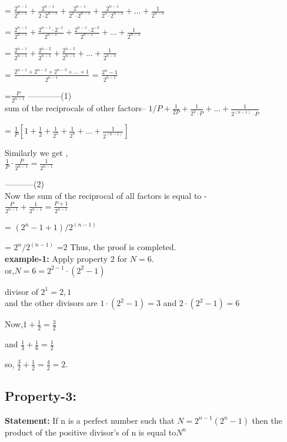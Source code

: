 \documentclass[12pt,,a4paper]{book}
\begin{document}
= $\frac{2^{n-1}}{2^{n-1}} + \frac{2^{n-1}}{2 \cdot 2^{n-1}} + \frac{2^{n-1}}{2^2 \cdot 2^{n-1}} + \frac{2^{n-1}}{2^3 \cdot 2^{n-1}} + \ldots + \frac{1}{2^{n-1}}$

=  $\frac{2^{n-1}}{2^{n-1}} + \frac{2^{n-1} \cdot 2^{-1}}{2^{n-1}} + \frac{2^{n-1} \cdot 2^{-2}}{2^{n-1}} + \ldots + \frac{1}{2^{n-1}}$

=  $\frac{2^{n-1}}{2^{n-1}} + \frac{2^{n-2}}{2^{n-1}} + \frac{2^{n-3}}{2^{n-1}} + \ldots + \frac{1}{2^{n-1}}$

= $\frac{{2^{n-1} + 2^{n-2} + 2^{n-3} + \ldots + 1}}{{2^{n-1}}}$
= $\frac{{2^n - 1}}{{2^{n-1}}}$

=$\frac{P}{2^{n-1}}$
------------(1)\\
\vspace{10pt}
sum of the reciprocals of other factors--
$1/P + \frac{1}{2P} + \frac{1}{2^2 \cdot P} + \ldots + \frac{1}{2^{(n-1)} \cdot P}$

= $\frac{1}{P}\left[1 + \frac{1}{2} + \frac{1}{2^2} + \frac{1}{2^3} + \ldots + \frac{1}{2^{(n-1)}}\right]$

Similarly we get , \\
$\frac{1}{P} \cdot \frac{P}{2^{n-1}} = \frac{1}{2^{n-1}}$

-----------(2)\\
Now the sum of the reciprocal of all factors is equal to -\\
$\frac{P}{2^{n-1}} + \frac{1}{2^{n-1}} = \frac{P+1}{2^{n-1}}$

= \((2^n - 1 + 1) / 2^{(n - 1)}\)

= \(2^n / 2^{(n-1)}\)
=\(2\)
Thus, the proof is completed.\\

\textbf{example-1:} Apply property 2 for \(N = 6\).\\
or,\(N = 6 = 2^{2-1} \cdot (2^2 - 1)\)

divisor of  \(2^1 = 2{,}1\) \\
and the other divisors are \(1 \cdot (2^2 - 1) = 3\)
 and \(2 \cdot (2^2 - 1) = 6\)

Now,\(1 + \frac{1}{2} = \frac{3}{2}\)

and \(\frac{1}{3} + \frac{1}{6} = \frac{1}{2}\)

so,  \(\frac{3}{2} + \frac{1}{2} = \frac{4}{2} = 2\).\\

\subsection{Property-3:}
\textbf{Statement:}  If n is a perfect number such that \(N = 2^{n-1}(2^n-1)\)
 then the product of the positive divisor's of n is equal to\(N^n\) \\
\end{document}
